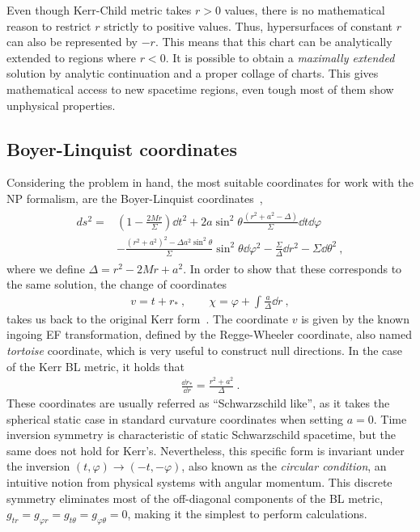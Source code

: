 Even though Kerr-Child metric takes $r>0$ values, there is no mathematical reason to restrict $r$ strictly to positive values.
Thus, hypersurfaces of constant $r$ can also be represented by $-r$. 
This means that this chart can be analytically extended to regions where $r<0$.
It is possible to obtain a \emph{maximally extended} solution by analytic continuation and a proper collage of charts.
This gives mathematical access to new spacetime regions, even tough most of them show unphysical properties.

\subsection{Boyer-Linquist coordinates}

Considering the problem in hand, the most suitable coordinates for work with the NP formalism, are the Boyer-Linquist coordinates~\cite{Boyer1967},
\begin{align}
    \begin{split}
        ds^2 = & \left(1 - \frac{2 M r}{\Sigma} \right) \dd t^2 + 2 a \sin^2\theta \frac{(r^2+a^2-\Delta)}{\Sigma} \dd t \dd \varphi \\
        &- \frac{(r^2+a^2)^2- \Delta a^2 \sin^2\theta}{\Sigma} \sin^2\theta \dd\varphi^2 - \frac{\Sigma}{\Delta} \dd r^2 - \Sigma \dd \theta^2 ~,
    \end{split}
    \label{eq2:KerrBL}
\end{align}
where we define $\Delta=r^2-2 M r + a^2$. In order to show that these corresponds to the same solution, the change of coordinates
\begin{align}
    v = t + r_* ~, \qquad \chi = \varphi + \int \frac{a}{\Delta} \dd r ~,
    \label{eq2:InEFtoBL}
\end{align}
takes us back to the original Kerr form~.
The coordinate $v$ is given by the known ingoing EF transformation, defined by the Regge-Wheeler coordinate, also named \emph{tortoise} coordinate, which is very useful to construct null directions. In the case of the Kerr BL metric, it holds that
\begin{align}
    \frac{\dd r_*}{\dd r} = \frac{r^2+a^2}{\Delta} ~.
    \label{eq2:tortoise}
\end{align}
These coordinates are usually referred as ``Schwarzschild like'', as it takes the spherical static case in standard curvature coordinates when setting $a=0$. 
Time inversion symmetry is characteristic of static Schwarzschild spacetime, but the same does not hold for Kerr's.
Nevertheless, this specific form is invariant under the inversion $(t,\varphi)\to(-t,-\varphi)$, also known as the \emph{circular condition}, an intuitive notion from physical systems with angular momentum.
This discrete symmetry eliminates most of the off-diagonal components of the BL metric, $g_{tr} = g_{\varphi r} = g_{t \theta} = g_{\varphi \theta} = 0$, making it the simplest to perform calculations.

